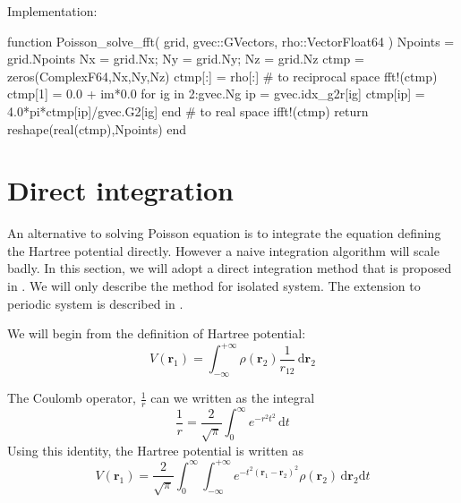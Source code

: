 Implementation:
\begin{juliacode}
function Poisson_solve_fft( grid, gvec::GVectors, rho::Vector{Float64} )
  Npoints = grid.Npoints
  Nx = grid.Nx; Ny = grid.Ny; Nz = grid.Nz
  ctmp = zeros(ComplexF64,Nx,Ny,Nz)
  ctmp[:] = rho[:]
  # to reciprocal space
  fft!(ctmp)
  ctmp[1] = 0.0 + im*0.0
  for ig in 2:gvec.Ng
      ip = gvec.idx_g2r[ig]
      ctmp[ip] = 4.0*pi*ctmp[ip]/gvec.G2[ig]
  end
  # to real space
  ifft!(ctmp)
  return reshape(real(ctmp),Npoints)
end
\end{juliacode}



\section{Direct integration}

An alternative to solving Poisson equation is to integrate the equation defining
the Hartree potential directly. However a naive integration algorithm will scale
badly. In this section, we will adopt a direct integration method that is proposed
in \cite{Sundholm2005}. We will only describe the method for isolated system.
The extension to periodic system is described in \cite{Losilla2010}.

We will begin from the definition of Hartree potential:
\begin{equation}
V(\mathbf{r}_{1}) = \int_{-\infty}^{+\infty}
\rho(\mathbf{r}_{2}) \frac{1}{r_{12}} \, \mathrm{d}\mathbf{r}_{2}
\end{equation}

The Coulomb operator, $\frac{1}{r}$ can we written as the integral
\begin{equation}
\frac{1}{r} = \frac{2}{\sqrt{\pi}} \int_{0}^{\infty} e^{-r^2 t^2}\,\mathrm{d}t
\end{equation}
Using this identity, the Hartree potential is written as
\begin{equation}
V(\mathbf{r}_{1}) = \frac{2}{\sqrt{\pi}}
\int_{0}^{\infty}
\int_{-\infty}^{+\infty}
e^{-t^2(\mathbf{r}_1 - \mathbf{r}_2)^2} \rho(\mathbf{r}_2)
\, \mathrm{d}\mathbf{r}_{2}\mathrm{d}t
\end{equation}


